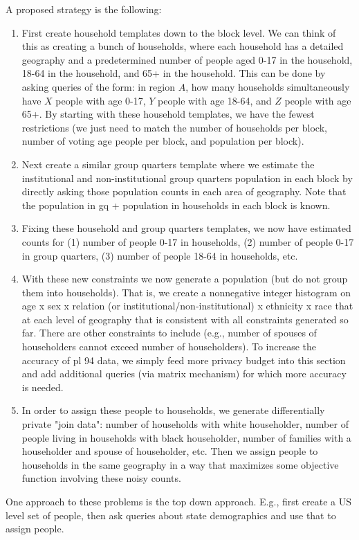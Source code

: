 \documentclass{amsart}
\begin{document}
{A proposed strategy is the following:
\begin{enumerate}
\item First create household templates down to the block level. We can think of this as creating a bunch of households, where each household has a detailed geography and a predetermined number of people aged 0-17 in the household, 18-64 in the household, and 65+ in the household. This can be done by asking queries of the form: in region $A$, how many households simultaneously have $X$ people with age 0-17, $Y$ people with age 18-64, and $Z$ people with age 65+. By starting with these household templates, we have the fewest restrictions (we just need to match the number of households per block, number of voting age people per block, and population per block).
\item Next create a similar group quarters template where we estimate the institutional and non-institutional group quarters population in each block by directly asking those population counts in each area of geography. Note that the population in gq + population in households in each block is known.
\item Fixing these household and group quarters templates, we now have estimated counts for (1) number of people 0-17 in households, (2) number of people 0-17 in group quarters, (3) number of people 18-64 in households, etc.
\item With these new constraints we now generate a population (but do not group them into households). That is, we create a nonnegative integer histogram on age x sex x relation (or institutional/non-institutional) x ethnicity x race that at each level of geography that is consistent with all constraints generated so far. There are other constraints to include (e.g., number of spouses of householders cannot exceed number of householders). To increase the accuracy of pl 94 data, we simply feed more privacy budget into this section and add additional queries (via matrix mechanism) for which more accuracy is needed.
\item In order to assign these people to households, we generate differentially private "join data": number of households with white householder, number of people living in households with black householder, number of families with a householder and spouse of householder, etc. Then we assign people to households in the same geography in a way that maximizes some objective function involving these noisy counts.
\end{enumerate}
One approach to these problems is the top down approach. E.g., first create a US level set of people, then ask queries about state demographics and use that to assign people.

}
\end{document}
